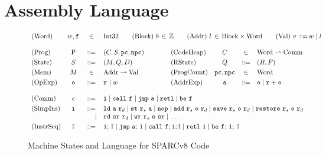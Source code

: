 \section{\sparc{} Assembly Language}
\label{sec:modeling}
\begin{figure}[!t]
	\centering
	\small
	\[
		\begin{array}{lcclclccl}
			\TYPE{(Word)} & \word, \lab{} & \in &
			\multicolumn{6}{l}
			{
				\TYPE{Int32} \qquad
				\TYPE{(Block)} \ \block \, \in \, \Ztype
				\qquad
				\TYPE{(Addr)} \ \loc \, \in \,
					\TYPE{Block} \times \TYPE{Word}
				\qquad
				\TYPE{(Val)} \ \val \,
					\define \, \word \sepline \loc
			}
			\\
			\\
			\TYPE{(Prog)} & \prog & \define &
				(\code, \state, \pc, \npc) & \qquad &
			\TYPE{(CodeHeap)} & \ \code \ & \in &
				\TYPE{Word} \rightharpoonup \TYPE{Comm}
			\\
			\\[-9pt]
			\TYPE{(State)} & \state & \define &
				(\mem, \Rstate, \DBuf) & &
			\TYPE{(RState)} & \Rstate & \define &
				(\RFile, \Wstack)
			\\
			\\[-9pt]
			\TYPE{(Mem)} & \mem & \in &
				\TYPE{Addr} \rightharpoonup \TYPE{Val}
			& &
			\TYPE{(ProgCount)} & \pc, \npc & \in & \TYPE{Word}
			\\
			\\[-9pt]
			\TYPE{(OpExp)} & \oexp & \define &
				\reg{} \sepline \word & &
			\TYPE{(AddrExp)} & \aexp & \define &
				\oexp \sepline \reg{} + \oexp \\
			\\
			\TYPE{(Comm)} & \comm & \define &
			\multicolumn{6}{l}
			{
				\simplins{} \sepline \call{} \ \lab{}
				\sepline \jmp{} \ \aexp \sepline \retl{} \sepline
				\be \ \lab{}
			} \\
			\\[-9pt]
			\TYPE{(SimpIns)} & \simplins{} & \define &
			\multicolumn{6}{l}
			{
				\ld{} \ \aexp \ \reg{d} \sepline
				\st{} \ \reg{s} \ \aexp \sepline
				\nop{} \sepline
				\cadd{} \ \reg{s} \ \oexp \ \reg{d} \sepline
				\csave{} \ \reg{s} \ \oexp \ \reg{d} \sepline
				\crestore{} \ \reg{s} \ \oexp \ \reg{d}
			} \\
			& & \ \ \ \ | &
			\multicolumn{6}{l}
			{
				\rd{} \ \sr \ \reg{d} \sepline
				\cwr{} \ \reg{s} \ \oexp \ \sr \sepline
				\dots
			} \\
			\\[-9pt]
			\TYPE{(InstrSeq)} & \cblk & \define &
			\multicolumn{6}{l}
			{
				\simplins{}; \, \cblk \sepline
				\jmp{} \ \aexp; \, \simplins{} \sepline
				\call{} \ \lab{}; \simplins{}; \cblk \sepline
				\retl{} \ \simplins{} \sepline
				\be{} \ \lab{}; \, \simplins{}; \, \cblk
			}
		\end{array}
	\]
	\vspace*{-0.5em}
	\caption{Machine States and Language for SPARCv8 Code}
	\label {fig:Machine States and Language for SPARC Code}
	\vspace*{-0.5em}
\end{figure}

